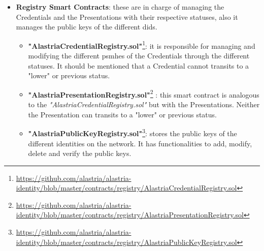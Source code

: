 \documentclass[a4paper, 12pt]{article} %
\begin{document}
\begin{itemize}
\begin{itemize}
                    \item \textbf{"AlastriaIdentityServiceProvider.sol"}\footnote{\url{https://github.com/alastria/alastria-identity/blob/master/contracts/identityManager/AlastriaIdentityServiceProvider.sol}}: similar to the previous Smart Contract, its functionality is to provide the entities with the role of Service Provider. To do this, it stores the entities in a mapping.
                    \item \textbf{"AlastriaIdentityEntity.sol"}\footnote{\url{https://github.com/alastria/alastria-identity/blob/master/contracts/identityManager/AlastriaIdentityEntity.sol}}: it stores entity information, such as name, cif, logo \acrshort{url}, \acrshort{did}, \acrshort{url} of the Alastria Open Access and a flag to know if the entity is active or not.
                    \item \textbf{"AlastriaProxy.sol"}\footnote{\url{https://github.com/alastria/alastria-identity/blob/master/contracts/identityManager/AlastriaProxy.sol}}: this Contract, as its name indicates, acts as a proxy for the account \acrshort{eoa} that is carrying out the transaction. Since any call (except for a few) will always go through the account's proxy. It is responsible for emitting an event of what is being used.
                \end{itemize}
                \item \textbf{Registry Smart Contracts}: these are in charge of managing the Credentials and the Presentations with their respective statuses, also it manages the public keys of the different \acrshort{did}s.
                \begin{itemize}
                    \item \textbf{"AlastriaCredentialRegistry.sol"}\footnote{\url{https://github.com/alastria/alastria-identity/blob/master/contracts/registry/AlastriaCredentialRegistry.sol}}: it is responsible for managing and modifying the different \acrshort{psmh}es of the Credentials through the different statuses. It should be mentioned that a Credential cannot transits to a "lower" or previous status.
                    \item \textbf{"AlastriaPresentationRegistry.sol"}\footnote{\url{https://github.com/alastria/alastria-identity/blob/master/contracts/registry/AlastriaPresentationRegistry.sol}} : this smart contract is analogous to the \textit{"AlastriaCredentialRegistry.sol"} but with the Presentations. Neither the Presentation can transits to a "lower" or previous status.
                    \item \textbf{"AlastriaPublicKeyRegistry.sol"}\footnote{\url{https://github.com/alastria/alastria-identity/blob/master/contracts/registry/AlastriaPublicKeyRegistry.sol}}: stores the public keys of the different identities on the network. It has functionalities to add, modify, delete and verify the public keys.

\end{itemize}
\end{itemize}
\end{document}
